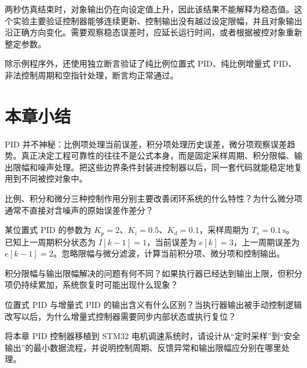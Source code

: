 两秒仿真结束时，对象输出仍在向设定值上升，因此该结果不能解释为稳态值。这个实验主要验证控制器能够连续更新、控制输出没有越过设定限幅，并且对象输出沿正确方向变化。需要观察稳态误差时，应延长运行时间，或者根据被控对象重新整定参数。

除示例程序外，还使用独立断言验证了纯比例位置式 PID、纯比例增量式 PID、非法控制周期和空指针处理，断言均正常通过。

\section{本章小结}

PID 并不神秘：比例项处理当前误差，积分项处理历史误差，微分项观察误差趋势。真正决定工程可靠性的往往不是公式本身，而是固定采样周期、积分限幅、输出限幅和噪声处理。把这些边界条件封装进控制器以后，同一套代码就能稳定地复用到不同被控对象中。

\begin{problemset}
\item 比例、积分和微分三种控制作用分别主要改善闭环系统的什么特性？为什么微分项通常不直接对含噪声的原始误差作差分？
\item 某位置式 PID 的参数为 $K_p=2$、$K_i=0.5$、$K_d=0.1$，采样周期为 $T_s=0.1\,\mathrm{s}$。已知上一周期积分状态为 $I[k-1]=1$，当前误差为 $e[k]=3$，上一周期误差为 $e[k-1]=2$。忽略限幅与微分滤波，计算当前积分项、微分项和控制输出。
\item 积分限幅与输出限幅解决的问题有何不同？如果执行器已经达到输出上限，但积分项仍持续累加，系统恢复时可能出现什么现象？
\item 位置式 PID 与增量式 PID 的输出含义有什么区别？当执行器输出被手动控制逻辑改写以后，为什么增量式控制器需要同步内部状态或执行复位？
\item 将本章 PID 控制器移植到 STM32 电机调速系统时，请设计从“定时采样”到“安全输出”的最小数据流程，并说明控制周期、反馈异常和输出限幅应分别在哪里处理。
\end{problemset}
